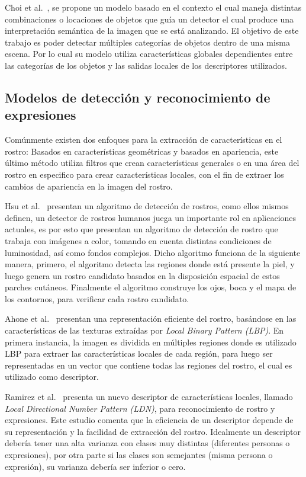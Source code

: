 Choi et al.~\cite{treebased2012}, se propone un modelo basado en el contexto el cual maneja distintas combinaciones o locaciones de objetos que guía un detector el cual produce una interpretación semántica de la imagen que se está analizando. El objetivo de este trabajo es poder detectar múltiples categorías de objetos dentro de una misma escena. Por lo cual su modelo utiliza características globales dependientes entre las categorías de los objetos y las salidas locales de los descriptores utilizados.

\subsection{Modelos de detección y reconocimiento de expresiones}
Comúnmente existen dos enfoques para la extracción de características en el rostro: Basados en características geométricas y basados en apariencia, este último método utiliza filtros que crean características generales o en una área del rostro en especifico para crear características locales, con el fin de extraer los cambios de apariencia en la imagen del rostro.

Hsu et al.~\cite{Hsu2002} presentan un algoritmo de detección de rostros, como ellos mismos definen, un detector de rostros humanos juega un importante rol en aplicaciones actuales, es por esto que presentan un algoritmo de detección de rostro que trabaja con imágenes a color, tomando en cuenta distintas condiciones de luminosidad, así como fondos complejos. Dicho algoritmo funciona de la siguiente manera, primero, el algoritmo detecta las regiones donde está presente la piel, y luego genera un rostro candidato basados en la disposición espacial de estos parches cutáneos. Finalmente el algoritmo construye los ojos, boca y el mapa de los contornos, para verificar cada rostro candidato.

Ahone et al.~\cite{ahonen2006} presentan una representación eficiente del rostro, basándose en las características de las texturas extraídas por \textit{Local Binary Pattern (LBP)}. En primera instancia, la imagen es dividida en múltiples regiones donde es utilizado LBP para extraer las características locales de cada región, para luego ser representadas en un vector que contiene todas las regiones del rostro, el cual es utilizado como descriptor.

Ramirez et al.~\cite{ldnp2013} presenta un nuevo descriptor de características locales, llamado \textit{Local Directional Number Pattern (LDN)}, para reconocimiento de rostro y expresiones. Este estudio comenta que la eficiencia de un descriptor depende de su representación y la facilidad de extracción del rostro. Idealmente un descriptor debería tener una alta varianza con clases muy distintas (diferentes personas o expresiones), por otra parte si las clases son semejantes (misma persona o expresión), su varianza debería ser inferior o cero.

